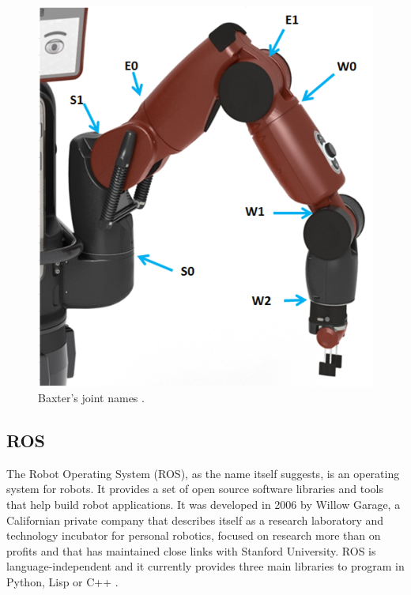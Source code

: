 \documentclass{l4proj}
\begin{document}
\vspace{10mm}
\begin{figure}[h!]
\centering
\includegraphics[scale=0.8]{baxter_joint_names.png}
\caption{Baxter's joint names \cite{ArmSpecs}.}
\label{Baxter_joint_names}
\end{figure}

\vspace{10mm}

\subsection{ROS}

The Robot Operating System (ROS), as the name itself suggests, is an operating system for robots. It provides a set of open source software libraries and tools that help build robot applications. It was developed in 2006 by Willow Garage, a Californian private company that describes itself as a research laboratory and technology incubator for personal robotics, focused on research more than on profits and that has maintained close links with Stanford University. ROS is language-independent and it currently provides three main libraries to program in Python, Lisp or C++ \cite{ROS}.
\end{document}
